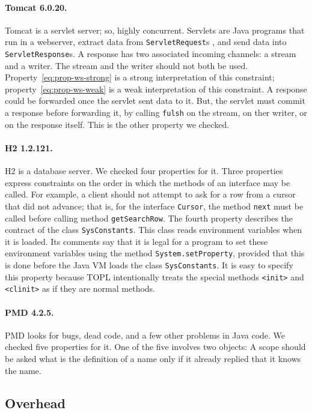 \documentclass[9pt, preprint]{sigplanconf} %
\theoremstyle{definition}
\theoremstyle{remark}
\begin{document}
\paragraph{Tomcat 6.0.20.}
Tomcat is a servlet server; so, highly concurrent.
Servlets are Java programs that run in a webserver, extract data from {\tt ServletRequest}s , and send data into {\tt ServletResponse}s.
A response has two associated incoming channels: a stream and a writer.
The stream and the writer should not both be used.
Property~\eqref{eq:prop-ws-strong} is a strong interpretation of this constraint;
property~\eqref{eq:prop-ws-weak} is a weak interpretation of this constraint.
A response could be forwarded once the servlet sent data to it.
But, the servlet must commit a response before forwarding it, by calling {\tt fulsh} on the stream, on ther writer, or on the response itself.
This is the other property we checked.

\paragraph{H2 1.2.121.}
H2 is a database server.
We checked four properties for it.
Three properties express constraints on the order in which the methods of an interface may be called.
For example, a client should not attempt to ask for a row from a cursor that did not advance;
that is, for the interface {\tt Cursor}, the method {\tt next} must be called before calling method {\tt getSearchRow}.
The fourth property describes the contract of the class {\tt SysConstants}.
This class reads environment variables when it is loaded.
Its comments say that it is legal for a program to set these environment variables using the method {\tt System.setProperty}, provided that this is done before the Java VM loads the class {\tt SysConstants}.
It is easy to specify this property because TOPL intentionally treats the special methods {\tt <init>} and {\tt <clinit>} as if they are normal methods.

\paragraph{PMD 4.2.5.}
PMD looks for bugs, dead code, and a few other problems in Java code.
We checked five properties for it.
One of the five involves two objects:
A scope should be asked what is the definition of a name only if it already replied that it knows the name.

\subsection{Overhead} %
\end{document}
